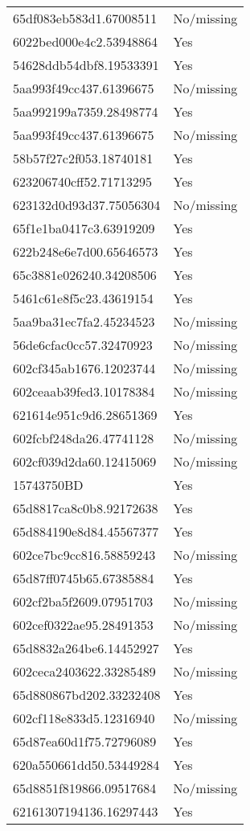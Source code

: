 \begin{tabular}{ll}
65df083eb583d1.67008511 & No/missing \\
6022bed000e4c2.53948864 & Yes \\
54628ddb54dbf8.19533391 & Yes \\
5aa993f49cc437.61396675 & No/missing \\
5aa992199a7359.28498774 & Yes \\
5aa993f49cc437.61396675 & No/missing \\
58b57f27c2f053.18740181 & Yes \\
623206740cff52.71713295 & Yes \\
623132d0d93d37.75056304 & No/missing \\
65f1e1ba0417c3.63919209 & Yes \\
622b248e6e7d00.65646573 & Yes \\
65c3881e026240.34208506 & Yes \\
5461c61e8f5c23.43619154 & Yes \\
5aa9ba31ec7fa2.45234523 & No/missing \\
56de6cfac0cc57.32470923 & No/missing \\
602cf345ab1676.12023744 & No/missing \\
602ceaab39fed3.10178384 & No/missing \\
621614e951c9d6.28651369 & Yes \\
602fcbf248da26.47741128 & No/missing \\
602cf039d2da60.12415069 & No/missing \\
15743750BD & Yes \\
65d8817ca8c0b8.92172638 & Yes \\
65d884190e8d84.45567377 & Yes \\
602ce7bc9cc816.58859243 & No/missing \\
65d87ff0745b65.67385884 & Yes \\
602cf2ba5f2609.07951703 & No/missing \\
602cef0322ae95.28491353 & No/missing \\
65d8832a264be6.14452927 & Yes \\
602ceca2403622.33285489 & No/missing \\
65d880867bd202.33232408 & Yes \\
602cf118e833d5.12316940 & No/missing \\
65d87ea60d1f75.72796089 & Yes \\
620a550661dd50.53449284 & Yes \\
65d8851f819866.09517684 & No/missing \\
62161307194136.16297443 & Yes \\

\end{tabular}
